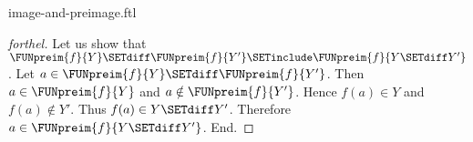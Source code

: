 \documentclass{naproche-library}
\begin{document}
\begin{smodule}[title=Computation Laws for Images and Preimages]{image-and-preimage.ftl}
\begin{proof}[forthel]
  Let us show that $\FUNpreim{f}{Y} \SETdiff \FUNpreim{f}{Y'} \SETinclude \FUNpreim{f}{Y \SETdiff Y'}$.
    Let $a \in \FUNpreim{f}{Y} \SETdiff \FUNpreim{f}{Y'}$.
    Then $a \in \FUNpreim{f}{Y}$ and $a \notin \FUNpreim{f}{Y'}$.
    Hence $f(a) \in Y$ and $f(a) \notin Y'$.
    Thus $f(a) \in Y \SETdiff Y'$.
    Therefore $a \in \FUNpreim{f}{Y \SETdiff Y'}$.
  End.
\end{proof}
\end{smodule}
\end{document}
